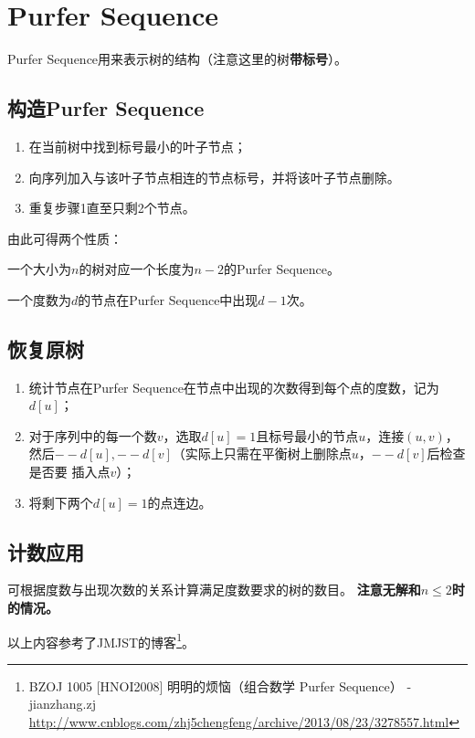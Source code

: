 \section{Purfer Sequence}
Purfer Sequence用来表示树的结构（注意这里的树{\bfseries 带标号}）。
\subsection{构造Purfer Sequence}
\begin{enumerate}
	\item 在当前树中找到标号最小的叶子节点；
	\item 向序列加入与该叶子节点相连的节点标号，并将该叶子节点删除。
	\item 重复步骤1直至只剩2个节点。
\end{enumerate}
由此可得两个性质：
\begin{property}[唯一性]
	一个大小为$n$的树对应一个长度为$n-2$的Purfer Sequence。
\end{property}
\begin{property}
	一个度数为$d$的节点在Purfer Sequence中出现$d-1$次。
\end{property}
\subsection{恢复原树}
\begin{enumerate}
	\item 统计节点在Purfer Sequence在节点中出现的次数得到每个点的度数，记为$d[u]$；
	\item 对于序列中的每一个数$v$，选取$d[u]=1$且标号最小的节点$u$，连接$(u,v)$，
	      然后$--d[u],--d[v]$（实际上只需在平衡树上删除点$u$，$--d[v]$后检查是否要
	      插入点$v$）；
	\item 将剩下两个$d[u]=1$的点连边。
\end{enumerate}
\subsection{计数应用}
可根据度数与出现次数的关系计算满足度数要求的树的数目。
{\bfseries 注意无解和$n\leq 2$时的情况。}

以上内容参考了JMJST的博客\footnote{
	BZOJ 1005 [HNOI2008] 明明的烦恼（组合数学 Purfer Sequence） - jianzhang.zj
	\url{http://www.cnblogs.com/zhj5chengfeng/archive/2013/08/23/3278557.html}
}。
